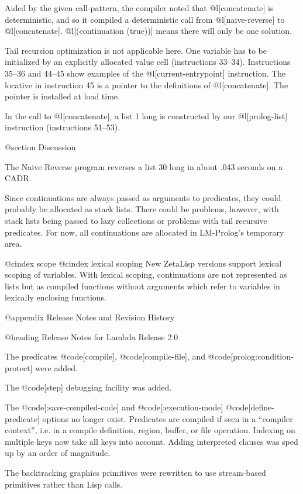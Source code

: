 {Aided by the given call-pattern, the compiler noted that @l[concatenate]
is deterministic, and so it compiled a deterministic call from 
@l[naive-reverse] to @l[concatenate]. @l[(continuation (true))]
means there will only be one solution.

Tail recursion optimization is not applicable here.
One variable has to be initialized by an explicitly allocated value cell
(instructions 33--34).
Instructions 35--36 and 44--45 show examples of the @l[current-entrypoint] 
instruction. The locative in instruction 45 is a pointer to the
definitions of @l[concatenate]. The pointer is installed at load time.

In the call to @l[concatenate], a list 1 long is constructed by our
@l[prolog-list] instruction (instructions 51--53).

@section Discussion

The Naive Reverse program reverses a list 30 long in about .043 seconds on a
CADR.

Since continuations are always passed as arguments to predicates,
they could probably be allocated as stack lists.  There could be
problems, however, with stack lists being passed to lazy collections
or problems with tail recursive predicates.  For now, all continuations
are allocated in LM-Prolog's temporary area.

@cindex scope
@cindex lexical scoping
New ZetaLisp versions support lexical scoping of variables. With lexical
scoping, continuations are not represented as lists but as compiled
functions without arguments which refer to variables in lexically
enclosing functions.

@appendix Release Notes and Revision History

@heading Release Notes for Lambda Release 2.0

The predicates @code[compile], @code[compile-file], and
@code[prolog:condition-protect] were added.

The @code[step] debugging facility was added.

The @code[:save-compiled-code] and @code[:execution-mode]
@code[define-predicate] options no longer exist.  Predicates are
compiled if seen in a ``compiler context'', i.e. in a compile
definition, region, buffer, or file operation.  Indexing on multiple
keys now take all keys into account.  Adding interpreted clauses
was sped up by an order of magnitude.

The backtracking graphics primitives were rewritten to use
stream-based primitives rather than Lisp calls.

}
